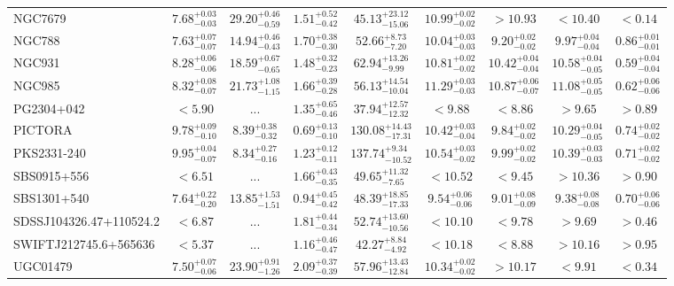 \documentclass[onecolumn]{mn2e}
\begin{document}
{\begin{center}
\begin{longtable}{lcccccccc}
NGC7679 & $7.68_{-0.03}^{+0.03}$ & $29.20_{-0.59}^{+0.46}$ & $1.51_{-0.42}^{+0.52}$ &$45.13_{-15.06}^{+23.12}$ & $10.99_{-0.02}^{+0.02}$ & $>10.93$ & $<10.40$ & $<0.14$ \\
NGC788 & $7.63_{-0.07}^{+0.07}$ & $14.94_{-0.43}^{+0.46}$ & $1.70_{-0.30}^{+0.38}$ &$52.66_{-7.20}^{+8.73}$ & $10.04_{-0.03}^{+0.03}$ & $9.20_{-0.02}^{+0.02}$ & $9.97_{-0.04}^{+0.04}$ & $0.86_{-0.01}^{+0.01}$ \\
NGC931 & $8.28_{-0.06}^{+0.06}$ & $18.59_{-0.65}^{+0.67}$ & $1.48_{-0.23}^{+0.32}$ &$62.94_{-9.99}^{+13.26}$ & $10.81_{-0.02}^{+0.02}$ & $10.42_{-0.04}^{+0.04}$ & $10.58_{-0.05}^{+0.04}$ & $0.59_{-0.04}^{+0.04}$ \\
NGC985 & $8.32_{-0.07}^{+0.08}$ & $21.73_{-1.15}^{+1.08}$ & $1.66_{-0.28}^{+0.39}$ &$56.13_{-10.04}^{+14.54}$ & $11.29_{-0.03}^{+0.03}$ & $10.87_{-0.07}^{+0.06}$ & $11.08_{-0.05}^{+0.05}$ & $0.62_{-0.06}^{+0.06}$ \\
PG2304+042 & $<5.90$ & ... & $1.35_{-0.46}^{+0.65}$ &$37.94_{-12.32}^{+12.57}$ & $<9.88$ & $<8.86$ & $>9.65$ & $>0.89$ \\
PICTORA & $9.78_{-0.10}^{+0.09}$ & $8.39_{-0.32}^{+0.38}$ & $0.69_{-0.10}^{+0.13}$ &$130.08_{-17.31}^{+14.43}$ & $10.42_{-0.04}^{+0.03}$ & $9.84_{-0.02}^{+0.02}$ & $10.29_{-0.05}^{+0.04}$ & $0.74_{-0.02}^{+0.02}$ \\
PKS2331-240 & $9.95_{-0.07}^{+0.04}$ & $8.34_{-0.16}^{+0.27}$ & $1.23_{-0.11}^{+0.12}$ &$137.74_{-10.52}^{+9.34}$ & $10.54_{-0.02}^{+0.03}$ & $9.99_{-0.02}^{+0.02}$ & $10.39_{-0.03}^{+0.03}$ & $0.71_{-0.02}^{+0.02}$ \\
SBS0915+556 & $<6.51$ & ... & $1.66_{-0.35}^{+0.43}$ &$49.65_{-7.65}^{+11.32}$ & $<10.52$ & $<9.45$ & $>10.36$ & $>0.90$ \\
SBS1301+540 & $7.64_{-0.20}^{+0.22}$ & $13.85_{-1.51}^{+1.53}$ & $0.94_{-0.42}^{+0.45}$ &$48.39_{-17.33}^{+18.85}$ & $9.54_{-0.06}^{+0.06}$ & $9.01_{-0.09}^{+0.08}$ & $9.38_{-0.08}^{+0.08}$ & $0.70_{-0.06}^{+0.06}$ \\
SDSSJ104326.47+110524.2 & $<6.87$ & ... & $1.81_{-0.34}^{+0.44}$ &$52.74_{-10.56}^{+13.60}$ & $<10.10$ & $<9.78$ & $>9.69$ & $>0.46$ \\
SWIFTJ212745.6+565636 & $<5.37$ & ... & $1.16_{-0.47}^{+0.46}$ &$42.27_{-4.92}^{+8.84}$ & $<10.18$ & $<8.88$ & $>10.16$ & $>0.95$ \\
UGC01479 & $7.50_{-0.06}^{+0.07}$ & $23.90_{-1.26}^{+0.91}$ & $2.09_{-0.39}^{+0.37}$ &$57.96_{-12.84}^{+13.43}$ & $10.34_{-0.02}^{+0.02}$ & $>10.17$ & $<9.91$ & $<0.34$ \\

\end{longtable}
\end{center}}
\end{document}
